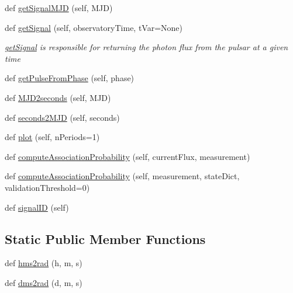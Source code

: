 \begin{DoxyCompactItemize}
\item 
def \hyperlink{classmodest_1_1signals_1_1poissonsource_1_1PeriodicPoissonSource_afdd9f1d963084ded9575140a5a8eebaf}{get\+Signal\+M\+JD} (self, M\+JD)
\item 
def \hyperlink{classmodest_1_1signals_1_1poissonsource_1_1PeriodicPoissonSource_ae60324eaba969cef5c9c6d9fe2e17574}{get\+Signal} (self, observatory\+Time, t\+Var=None)
\begin{DoxyCompactList}\small\item\em \hyperlink{classmodest_1_1signals_1_1poissonsource_1_1PeriodicPoissonSource_ae60324eaba969cef5c9c6d9fe2e17574}{get\+Signal} is responsible for returning the photon flux from the pulsar at a given time \end{DoxyCompactList}\item 
def \hyperlink{classmodest_1_1signals_1_1poissonsource_1_1PeriodicPoissonSource_a97162d8ee754468d82a7dbf9b1f1802f}{get\+Pulse\+From\+Phase} (self, phase)
\item 
def \hyperlink{classmodest_1_1signals_1_1poissonsource_1_1PeriodicPoissonSource_abb4ac1c9f5fbc156cb2d82d73feaf126}{M\+J\+D2seconds} (self, M\+JD)
\item 
def \hyperlink{classmodest_1_1signals_1_1poissonsource_1_1PeriodicPoissonSource_a838d12bdd873eeb217bb6a20c6f3bdcd}{seconds2\+M\+JD} (self, seconds)
\item 
def \hyperlink{classmodest_1_1signals_1_1poissonsource_1_1PeriodicPoissonSource_a61c220fea29637e4af1b180a77b48952}{plot} (self, n\+Periods=1)
\item 
def \hyperlink{classmodest_1_1signals_1_1poissonsource_1_1PoissonSource_a2f8a73e6f51cbdcd0f1e646d6f4d4574}{compute\+Association\+Probability} (self, current\+Flux, measurement)
\item 
def \hyperlink{classmodest_1_1signals_1_1signalsource_1_1SignalSource_a3d32dbed840ea9ac775b226f0a654831}{compute\+Association\+Probability} (self, measurement, state\+Dict, validation\+Threshold=0)
\item 
def \hyperlink{classmodest_1_1signals_1_1signalsource_1_1SignalSource_a9a64c6a9c2954f6ad61e4ca3518ea8ab}{signal\+ID} (self)
\end{DoxyCompactItemize}
\subsection*{Static Public Member Functions}
\begin{DoxyCompactItemize}
\item 
def \hyperlink{classmodest_1_1signals_1_1poissonsource_1_1PeriodicPoissonSource_ad4a21ba7fafdda922a7115cae864de71}{hms2rad} (h, m, s)
\item 
def \hyperlink{classmodest_1_1signals_1_1poissonsource_1_1PeriodicPoissonSource_aed68ade09a584a3025c52334506a04ab}{dms2rad} (d, m, s)
\end{DoxyCompactItemize}
